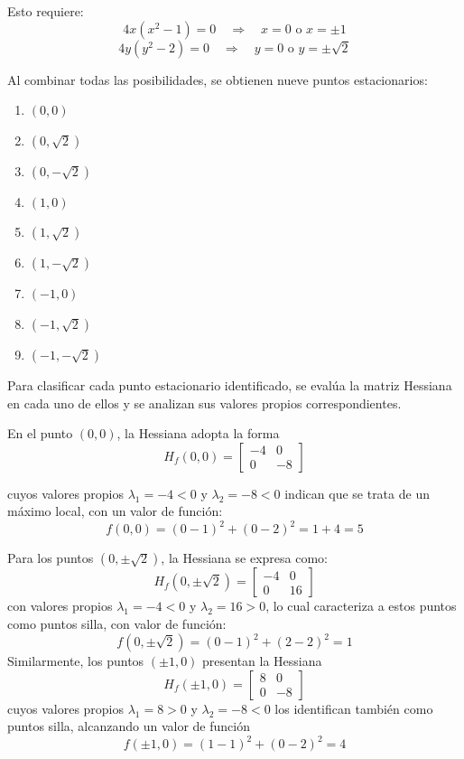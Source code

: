 \documentclass[12pt,a4paper]{article}
\begin{document}
Esto requiere:
\[4x(x^2 - 1) = 0 \quad \Rightarrow \quad x = 0 \text{ o } x = \pm 1\]
\[4y(y^2 - 2) = 0 \quad \Rightarrow \quad y = 0 \text{ o } y = \pm\sqrt{2}\]

Al combinar todas las posibilidades, se obtienen nueve puntos estacionarios:

\begin{enumerate}
    \item $(0, 0)$
    \item $(0, \sqrt{2})$
    \item $(0, -\sqrt{2})$
    \item $(1, 0)$
    \item $(1, \sqrt{2})$
    \item $(1, -\sqrt{2})$
    \item $(-1, 0)$
    \item $(-1, \sqrt{2})$
    \item $(-1, -\sqrt{2})$
\end{enumerate}

Para clasificar cada punto estacionario identificado, se evalúa la matriz Hessiana en cada uno de ellos y se analizan sus valores propios correspondientes.

En el punto $(0, 0)$, la Hessiana adopta la forma
\[H_f(0,0) = \begin{bmatrix} -4 & 0 \\ 0 & -8 \end{bmatrix}\]

cuyos valores propios $\lambda_1 = -4 < 0$ y $\lambda_2 = -8 < 0$ indican que se trata de un máximo local, con un valor de función:
\[f(0,0) = (0-1)^2 + (0-2)^2 = 1 + 4 = 5\]

Para los puntos $(0, \pm\sqrt{2})$, la Hessiana se expresa como:
\[H_f(0, \pm\sqrt{2}) = \begin{bmatrix} -4 & 0 \\ 0 & 16 \end{bmatrix}\]
con valores propios $\lambda_1 = -4 < 0$ y $\lambda_2 = 16 > 0$, lo cual caracteriza a estos puntos como puntos silla, con valor de función:
\[f(0, \pm\sqrt{2}) = (0-1)^2 + (2-2)^2 = 1\]
Similarmente, los puntos $(\pm 1, 0)$ presentan la Hessiana
\[H_f(\pm 1, 0) = \begin{bmatrix} 8 & 0 \\ 0 & -8 \end{bmatrix}\]
cuyos valores propios $\lambda_1 = 8 > 0$ y $\lambda_2 = -8 < 0$ los identifican también como puntos silla, alcanzando un valor de función
\[f(\pm 1, 0) = (1-1)^2 + (0-2)^2 = 4\]
\end{document}
